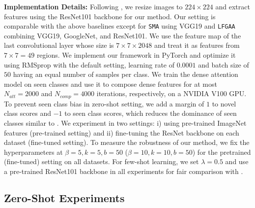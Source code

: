 \documentclass[10pt,journal,compsoc]{IEEEtran}
\newcommand{\1}{\boldsymbol{1}}
\newcommand{\0}{\boldsymbol{0}}
\newcommand{\<}{\langle}
\renewcommand{\>}{\rangle}
\newcommand{\myparagraph}[1]{\vspace{-2pt}\medskip\noindent\textbf{#1}}
\begin{document}
\myparagraph{Implementation Details:} 
Following \cite{Xian:CVPR17}, we resize images to $224\times 224$ and extract features using the ResNet101 backbone \cite{He:CVPR16} for our method. Our setting is comparable with the above baselines except for \texttt{SMA} using VGG19 and \texttt{LFGAA} combining VGG19, GoogleNet, and ResNet101.
We use the feature map of the last convolutional layer whose size is $7\times7\times2048$ and treat it as features from $7\times7=49$ regions. 
We implement our framework in PyTorch and optimize it using RMSprop\cite{Tijmen:COURSERA12} with the default setting, learning rate of $0.0001$ and batch size of $50$ having an equal number of samples per class. We train the dense attention model on seen classes and use it to compose dense features for at most $N_{att}=2000$ and $N_{comp}=4000$ iterations, respectively, on a NVIDIA V100 GPU. 
To prevent seen class bias in zero-shot setting, we add a margin of $1$ to novel class scores and $-1$ to seen class scores, which reduces the dominance of seen classes similar to \cite{Chao:ECCV16}.  
We experiment in two settings: i) using pre-trained ImageNet features (pre-trained setting) and ii) fine-tuning the ResNet backbone on each dataset (fine-tuned setting). 
To measure the robustness of our method, we fix the hyperparameters at $\beta=5,k=5,b=50$ ($\beta=10,k=10,b=50$) for the pretrained (fine-tuned) setting on all datasets.
For few-shot learning, we set $\lambda=0.5$ and use a pre-trained ResNet101 backbone in all experiments for fair comparison with \cite{Schonfeld:CVPR19}.



\subsection{Zero-Shot Experiments}
\end{document}
